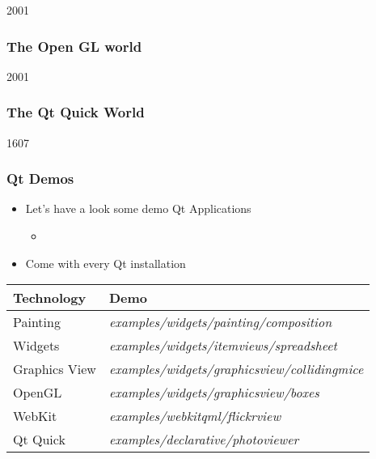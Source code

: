 
\begin{slide}{2001}\frametitle{The Open GL world}

\end{slide}


\begin{slide}{2001}\frametitle{The Qt Quick World}
\vspace*{10mm}

\end{slide}


\begin{slide}{1607}
  \frametitle{Qt Demos}
  \begin{itemize}
  \item Let's have a look some demo Qt Applications
   \begin{itemize}
    \item {}
    \end{itemize}
  \item Come with every Qt installation
 \end{itemize}
\medskip
\begin{tabular}{l|l}
    \textbf{Technology} & \textbf{Demo} \\ \hline
    Painting & \textit{examples/widgets/painting/composition} \\\hline
    Widgets & \textit{examples/widgets/itemviews/spreadsheet} \\\hline
    Graphics View & \textit{examples/widgets/graphicsview/collidingmice} \\\hline
    OpenGL & \textit{examples/widgets/graphicsview/boxes} \\\hline
    WebKit & \textit{examples/webkitqml/flickrview} \\\hline
    Qt Quick & \textit{examples/declarative/photoviewer} \\\hline
  \end{tabular}
\end{slide}
